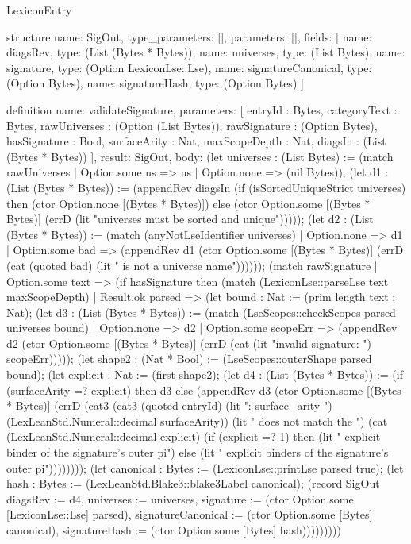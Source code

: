 \begin{lexlean}{LexiconEntry}
\begin{semanticmodule}
structure{
  name: SigOut,
  type_parameters: [],
  parameters: [],
  fields: [
    {name: diagsRev, type: (List (Bytes * Bytes))},
    {name: universes, type: (List Bytes)},
    {name: signature, type: (Option LexiconLse::Lse)},
    {name: signatureCanonical, type: (Option Bytes)},
    {name: signatureHash, type: (Option Bytes)}
  ]
}

definition{
  name: validateSignature,
  parameters: [
    entryId : Bytes,
    categoryText : Bytes,
    rawUniverses : (Option (List Bytes)),
    rawSignature : (Option Bytes),
    hasSignature : Bool,
    surfaceArity : Nat,
    maxScopeDepth : Nat,
    diagsIn : (List (Bytes * Bytes))
  ],
  result: SigOut,
  body: (let universes : (List Bytes) := (match rawUniverses
    | Option.some us => us
    | Option.none => (nil Bytes)); (let d1 : (List (Bytes * Bytes)) := (appendRev diagsIn (if (isSortedUniqueStrict universes) then (ctor Option.none [(Bytes * Bytes)]) else (ctor Option.some [(Bytes * Bytes)] (errD (lit "universes must be sorted and unique"))))); (let d2 : (List (Bytes * Bytes)) := (match (anyNotLseIdentifier universes)
    | Option.none => d1
    | Option.some bad => (appendRev d1 (ctor Option.some [(Bytes * Bytes)] (errD (cat (quoted bad) (lit " is not a universe name")))))); (match rawSignature
    | Option.some text => (if hasSignature then (match (LexiconLse::parseLse text maxScopeDepth)
      | Result.ok parsed => (let bound : Nat := (prim length text : Nat); (let d3 : (List (Bytes * Bytes)) := (match (LseScopes::checkScopes parsed universes bound)
        | Option.none => d2
        | Option.some scopeErr => (appendRev d2 (ctor Option.some [(Bytes * Bytes)] (errD (cat (lit "invalid signature: ") scopeErr))))); (let shape2 : (Nat * Bool) := (LseScopes::outerShape parsed bound); (let explicit : Nat := (first shape2); (let d4 : (List (Bytes * Bytes)) := (if (surfaceArity =? explicit) then d3 else (appendRev d3 (ctor Option.some [(Bytes * Bytes)] (errD (cat3 (cat3 (quoted entryId) (lit ": surface_arity ") (LexLeanStd.Numeral::decimal surfaceArity)) (lit " does not match the ") (cat (LexLeanStd.Numeral::decimal explicit) (if (explicit =? 1) then (lit " explicit binder of the signature's outer pi") else (lit " explicit binders of the signature's outer pi")))))))); (let canonical : Bytes := (LexiconLse::printLse parsed true); (let hash : Bytes := (LexLeanStd.Blake3::blake3Label canonical); (record SigOut {diagsRev := d4, universes := universes, signature := (ctor Option.some [LexiconLse::Lse] parsed), signatureCanonical := (ctor Option.some [Bytes] canonical), signatureHash := (ctor Option.some [Bytes] hash)}))))))))
}
\end{semanticmodule}
\end{lexlean}
